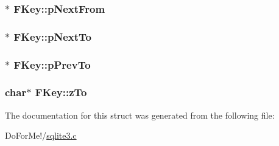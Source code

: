 \hypertarget{struct_f_key_ac64ff66b30167715c8822a74c2809075}{
\subsubsection[{p\-Next\-From}]{$\ast$ F\-Key\-::p\-Next\-From}}\label{struct_f_key_ac64ff66b30167715c8822a74c2809075}
\hypertarget{struct_f_key_ac29b26999113602e7e3921bf07643c04}{
\subsubsection[{p\-Next\-To}]{$\ast$ F\-Key\-::p\-Next\-To}}\label{struct_f_key_ac29b26999113602e7e3921bf07643c04}
\hypertarget{struct_f_key_a56189e420e91df86513e6895db518eca}{
\subsubsection[{p\-Prev\-To}]{$\ast$ F\-Key\-::p\-Prev\-To}}\label{struct_f_key_a56189e420e91df86513e6895db518eca}
\hypertarget{struct_f_key_a1eac10bab38a0ac9f88306fbbabbe5d6}{
\subsubsection[{z\-To}]{\setlength{\rightskip}{0pt plus 5cm}char$\ast$ F\-Key\-::z\-To}}\label{struct_f_key_a1eac10bab38a0ac9f88306fbbabbe5d6}


The documentation for this struct was generated from the following file\-:\begin{DoxyCompactItemize}
\item 
Do\-For\-Me!/\hyperlink{sqlite3_8c}{sqlite3.\-c}\end{DoxyCompactItemize}
